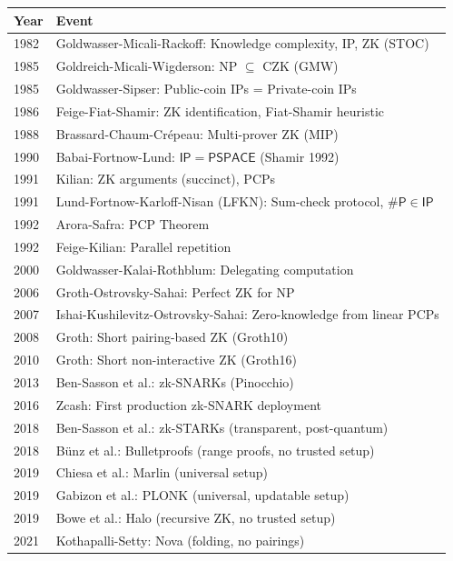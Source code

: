 \begin{tabularx}{\linewidth}{|l|X|}
\hline
\textbf{Year} & \textbf{Event} \\ \hline
1982 & Goldwasser-Micali-Rackoff: Knowledge complexity, IP, ZK (STOC) \\\hline
1985 & Goldreich-Micali-Wigderson: NP $\subseteq$ CZK (GMW) \\
\hline
1985 & Goldwasser-Sipser: Public-coin IPs = Private-coin IPs \\
\hline
1986 & Feige-Fiat-Shamir: ZK identification, Fiat-Shamir heuristic \\
\hline
1988 & Brassard-Chaum-Cr\'epeau: Multi-prover ZK (MIP) \\
\hline
1990 & Babai-Fortnow-Lund: $\mathsf{IP} = \mathsf{PSPACE}$ (Shamir 1992) \\
\hline
1991 & Kilian: ZK arguments (succinct), PCPs \\
\hline
1991 & Lund-Fortnow-Karloff-Nisan (LFKN): Sum-check protocol, $\#\mathsf{P} \in \mathsf{IP}$ \\
\hline
1992 & Arora-Safra: PCP Theorem \\
\hline
1992 & Feige-Kilian: Parallel repetition \\
\hline
2000 & Goldwasser-Kalai-Rothblum: Delegating computation \\
\hline
2006 & Groth-Ostrovsky-Sahai: Perfect ZK for NP \\
\hline
2007 & Ishai-Kushilevitz-Ostrovsky-Sahai: Zero-knowledge from linear PCPs \\
\hline
2008 & Groth: Short pairing-based ZK (Groth10) \\
\hline
2010 & Groth: Short non-interactive ZK (Groth16) \\
\hline
2013 & Ben-Sasson et al.: zk-SNARKs (Pinocchio) \\
\hline
2016 & Zcash: First production zk-SNARK deployment \\
\hline
2018 & Ben-Sasson et al.: zk-STARKs (transparent, post-quantum) \\
\hline
2018 & B\"unz et al.: Bulletproofs (range proofs, no trusted setup) \\
\hline
2019 & Chiesa et al.: Marlin (universal setup) \\
\hline
2019 & Gabizon et al.: PLONK (universal, updatable setup) \\
\hline
2019 & Bowe et al.: Halo (recursive ZK, no trusted setup) \\
\hline
2021 & Kothapalli-Setty: Nova (folding, no pairings) \\

\end{tabularx}
